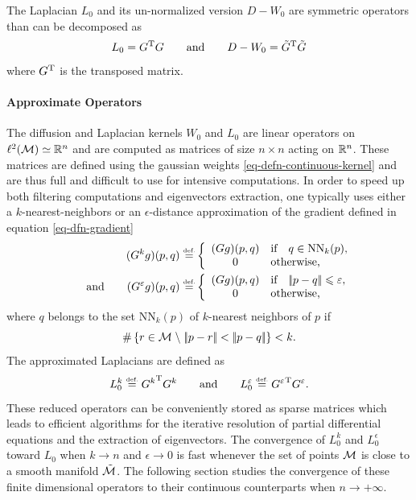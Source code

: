 \documentclass[final]{siamltex}
\begin{document}
The Laplacian $L_0$ and its un-normalized version $D-W_0$ are symmetric operators than can be decomposed as
\begin{equation}
	\label{eq-decomposition-laplacian}
	L_0 = \transp{G} G
	\qqandqq
	D-W_0 = \transp{\tilde G} \tilde G
\end{equation}
where ${G}^{\mathrm{T}}$ is the transposed matrix.


\paragraph{Approximate Operators}

The diffusion and Laplacian kernels $W_0$ and $L_0$ are linear operators on $\ell^2(\mathcal{M}) \simeq \mathbb{R}^n$ and are computed as matrices of size $n \times n$ acting on $\mathbb{R}^n$. These matrices are defined using the gaussian weights \eqref{eq-defn-continuous-kernel} and are thus full and difficult to use for intensive computations. In order to speed up both filtering computations and eigenvectors extraction, one typically uses either a $k$-nearest-neighbors or an $\epsilon$-distance approximation of the gradient defined in equation \eqref{eq-dfn-gradient}
\begin{align}
	\label{eq-lowdim-approx-grad}
	(G^{k} g)(p,q) \eqdef &
	\left\{ 
	\begin{array}{cl}
		(G g)(p,q) & \text{if}\quad  q \in \text{NN}_k(p),\\
		0 & \text{otherwise,}
	\end{array}
	\right. \\
	\qqandqq
	(G^{\epsilon} g)(p,q) \eqdef &
	\left\{ 
	\begin{array}{cl}
		(G g)(p,q) & \text{if} \quad \norm{p-q} \leq \epsilon,	\\
		0 & \text{otherwise,}
	\end{array}
	\right.
\end{align}
where $q$ belongs to the set $\text{NN}_k(p)$ of $k$-nearest neighbors of $p$ if
\begin{equation*} 
	\#\enscond{r \in \Mm}{ \norm{p-r}<\norm{p-q} } < k.
\end{equation*}
The approximated Laplacians are defined as
\begin{equation}
	\label{eq-approximate-laplacian}
	L_0^k \eqdef \transp{G^k}G^k
	\qqandqq
	L_0^\epsilon \eqdef \transp{G^\epsilon}G^\epsilon.
\end{equation}
These reduced operators can be conveniently stored as sparse matrices which leads to efficient algorithms for the iterative resolution of partial differential equations and the extraction of eigenvectors. The convergence of $L_0^k$ and $L_0^\epsilon$ toward $L_0$ when $k \rightarrow n$ and $\epsilon \rightarrow 0$ is fast whenever the set of points $\mathcal{M}$ is close to a smooth manifold $\tilde {\mathcal{M}}$. The following section studies the convergence of these finite dimensional operators to their continuous counterparts when $n \rightarrow +\infty$.
\end{document}
